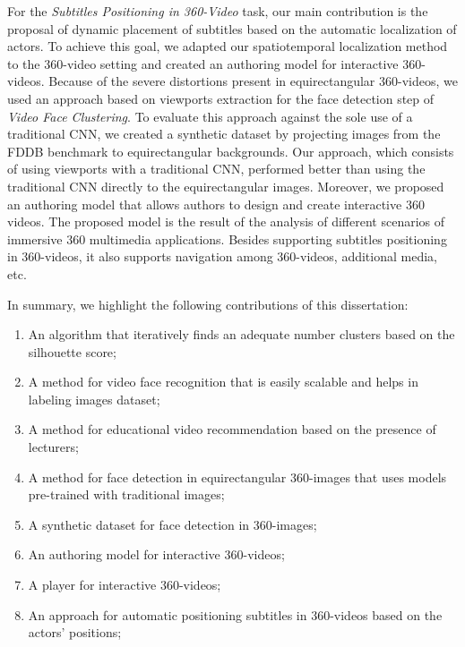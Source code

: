 For the \emph{Subtitles Positioning in 360-Video} task, our main contribution is the proposal of dynamic placement of subtitles based on the automatic localization of actors. To achieve this goal, we adapted our spatiotemporal localization method to the 360-video setting and created an authoring model for interactive 360-videos. Because of the severe distortions present in equirectangular 360-videos, we used an approach based on viewports extraction for the face detection step of \emph{Video Face Clustering}. To evaluate this approach against the sole use of a traditional CNN, we created a synthetic dataset by projecting images from the FDDB benchmark to equirectangular backgrounds. Our approach, which consists of using viewports with a traditional CNN, performed better than using the traditional CNN directly to the equirectangular images. Moreover, we proposed an authoring model that allows authors to design and create interactive 360 videos. The proposed model is the result of the analysis of different scenarios of immersive 360 multimedia applications. Besides supporting subtitles positioning in 360-videos, it also supports navigation among 360-videos, additional media, etc. 

In summary, we highlight the following contributions of this dissertation:
\begin{enumerate}
    \item An algorithm that iteratively finds an adequate number clusters based on the silhouette score;
    \item A method for video face recognition that is easily scalable and helps in labeling images dataset;
    \item A method for educational video recommendation based on the presence of lecturers;
    \item A method for face detection in equirectangular 360-images that uses models pre-trained with traditional images;
    \item A synthetic dataset for face detection in 360-images;
    \item An authoring model for interactive 360-videos;
    \item A player for interactive 360-videos;
    \item An approach for automatic positioning subtitles in 360-videos based on the actors' positions;
\end{enumerate}

